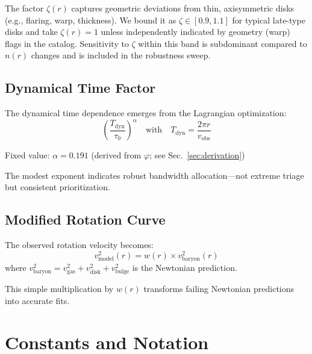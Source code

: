 \documentclass[twocolumn,prd,amsmath,amssymb,aps,superscriptaddress,nofootinbib]{revtex4-2}
\begin{document}
The factor $\zeta(r)$ captures geometric deviations from thin, axisymmetric disks (e.g., flaring, warp, thickness). We bound it as $\zeta\in[0.9,1.1]$ for typical late-type disks and take $\zeta(r)=1$ unless independently indicated by geometry (warp) flags in the catalog. Sensitivity to $\zeta$ within this band is subdominant compared to $n(r)$ changes and is included in the robustness sweep.

\subsection{Dynamical Time Factor}

The dynamical time dependence emerges from the Lagrangian optimization:
\begin{equation}
\left(\frac{T_{\text{dyn}}}{\tau_0}\right)^\alpha \quad \text{with} \quad T_{\text{dyn}} = \frac{2\pi r}{v_{\text{obs}}}
\end{equation}

Fixed value: $\alpha = 0.191$ (derived from $\varphi$; see Sec.~\ref{sec:derivation})

The modest exponent indicates robust bandwidth allocation---not extreme triage but consistent prioritization.

\subsection{Modified Rotation Curve}

The observed rotation velocity becomes:
\begin{equation}
v_{\text{model}}^2(r) = w(r) \times v_{\text{baryon}}^2(r)
\end{equation}
where $v_{\text{baryon}}^2 = v_{\text{gas}}^2 + v_{\text{disk}}^2 + v_{\text{bulge}}^2$ is the Newtonian prediction.

This simple multiplication by $w(r)$ transforms failing Newtonian predictions into accurate fits.

\section{Constants and Notation}
\label{sec:notation}
\end{document}
